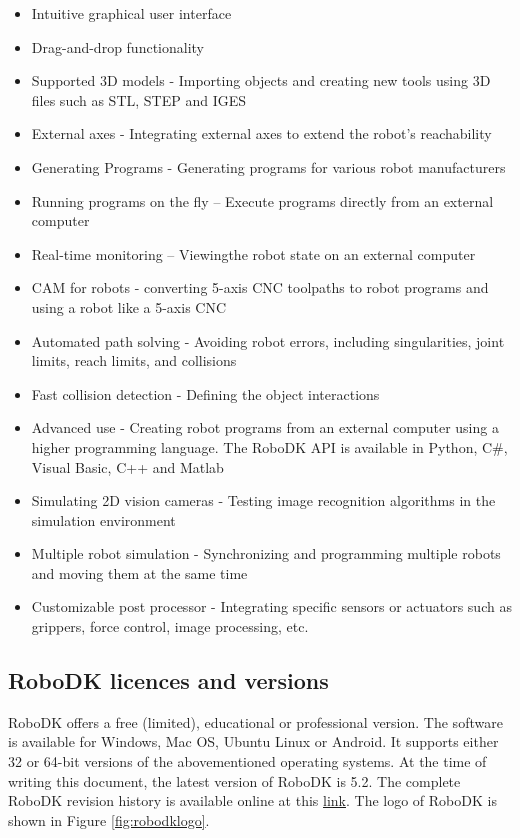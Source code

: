 \begin{itemize}
\item Intuitive graphical user interface
\item Drag-and-drop functionality 
\item Supported 3D models - Importing objects and creating new tools using 3D files such as STL, STEP and IGES
\item External axes - Integrating external axes to extend the robot’s reachability
\item Generating Programs - Generating programs for various robot manufacturers
\item Running programs on the fly – Execute programs directly from an external computer
\item Real-time monitoring – Viewingthe robot state on an external computer 
\item CAM for robots - converting 5-axis CNC toolpaths to robot programs and using a robot like a 5-axis CNC
\item Automated path solving - Avoiding robot errors, including singularities, joint limits, reach limits, and collisions
\item Fast collision detection - Defining the object interactions 
\item Advanced use - Creating robot programs from an external computer using a higher programming language. The RoboDK API is available in Python, C#, Visual Basic, C++ and Matlab
\item Simulating 2D vision cameras - Testing image recognition algorithms in the simulation environment
\item Multiple robot simulation - Synchronizing and programming multiple robots and moving them at the same time 
\item Customizable post processor - Integrating specific sensors or actuators such as grippers, force control, image processing, etc.
\end{itemize}

\subsection{RoboDK licences and versions}

RoboDK offers a free (limited), educational or professional version. 
The software is available for Windows, Mac OS, Ubuntu Linux or Android. It supports either 32 or 64-bit versions of the abovementioned operating systems. At the time of writing this document, the latest version of RoboDK is 5.2. The complete RoboDK revision history is available online at this \href{https://en.etsmtl.ca/unites-de-recherche/coro/accueil?lang=en-CA}{link}. The logo of RoboDK is shown in Figure \ref{fig:robodklogo}.

